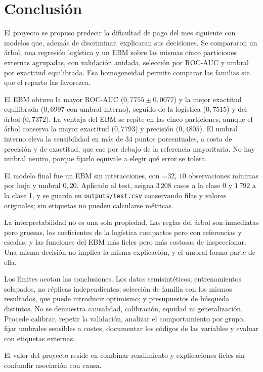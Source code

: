 \section{Conclusión}\label{sec:conclusion}

El proyecto se propuso predecir la dificultad de pago del mes siguiente con modelos que, además de discriminar, explicaran sus decisiones. Se compararon un árbol, una regresión logística y un EBM sobre las mismas cinco particiones externas agrupadas, con validación anidada, selección por ROC-AUC y umbral por exactitud equilibrada. Esa homogeneidad permite comparar las familias sin que el reparto las favorezca.

El EBM obtuvo la mayor ROC-AUC ($0{,}7755 \pm 0{,}0077$) y la mejor exactitud equilibrada ($0{,}6997$ con umbral interno), seguido de la logística ($0{,}7515$) y del árbol ($0{,}7372$). La ventaja del EBM se repite en las cinco particiones, aunque el árbol conserva la mayor exactitud ($0{,}7793$) y precisión ($0{,}4805$). El umbral interno eleva la sensibilidad en más de $34$ puntos porcentuales, a costa de precisión y de exactitud, que cae por debajo de la referencia mayoritaria. No hay umbral neutro, porque fijarlo equivale a elegir qué error se tolera.

El modelo final fue un EBM sin interacciones, con =32, $10$ observaciones mínimas por hoja y umbral $0{,}20$. Aplicado al test, asigna $3\,208$ casos a la clase 0 y $1\,792$ a la clase 1, y se guarda en \texttt{outputs/test.csv} conservando filas y valores originales; sin etiquetas no pueden calcularse métricas.

La interpretabilidad no es una sola propiedad. Las reglas del árbol son inmediatas pero gruesas, los coeficientes de la logística compactos pero con referencias y escalas, y las funciones del EBM más fieles pero más costosas de inspeccionar. Una misma decisión no implica la misma explicación, y el umbral forma parte de ella.

Los límites acotan las conclusiones. Los datos semisintéticos; entrenamientos solapados, no réplicas independientes; selección de familia con los mismos resultados, que puede introducir optimismo; y presupuestos de búsqueda distintos. No se demuestra causalidad, calibración, equidad ni generalización. Procede calibrar, repetir la validación, analizar el comportamiento por grupo, fijar umbrales sensibles a costes, documentar los códigos de las variables y evaluar con etiquetas externas.

El valor del proyecto reside en combinar rendimiento y explicaciones fieles sin confundir asociación con causa.
